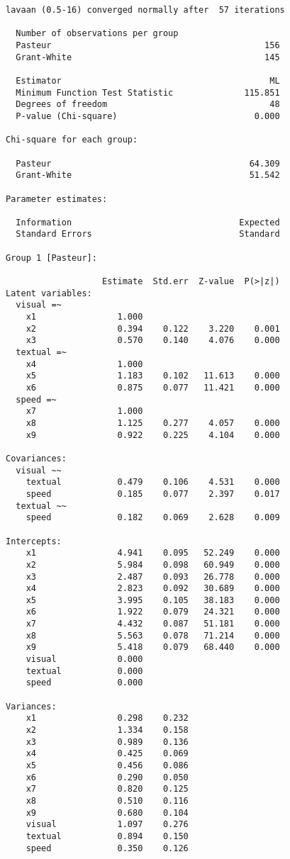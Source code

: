 \begin{verbatim}
lavaan (0.5-16) converged normally after  57 iterations

  Number of observations per group         
  Pasteur                                          156
  Grant-White                                      145

  Estimator                                         ML
  Minimum Function Test Statistic              115.851
  Degrees of freedom                                48
  P-value (Chi-square)                           0.000

Chi-square for each group:

  Pasteur                                       64.309
  Grant-White                                   51.542

Parameter estimates:

  Information                                 Expected
  Standard Errors                             Standard

Group 1 [Pasteur]:

                   Estimate  Std.err  Z-value  P(>|z|)
Latent variables:
  visual =~
    x1                1.000
    x2                0.394    0.122    3.220    0.001
    x3                0.570    0.140    4.076    0.000
  textual =~
    x4                1.000
    x5                1.183    0.102   11.613    0.000
    x6                0.875    0.077   11.421    0.000
  speed =~
    x7                1.000
    x8                1.125    0.277    4.057    0.000
    x9                0.922    0.225    4.104    0.000

Covariances:
  visual ~~
    textual           0.479    0.106    4.531    0.000
    speed             0.185    0.077    2.397    0.017
  textual ~~
    speed             0.182    0.069    2.628    0.009

Intercepts:
    x1                4.941    0.095   52.249    0.000
    x2                5.984    0.098   60.949    0.000
    x3                2.487    0.093   26.778    0.000
    x4                2.823    0.092   30.689    0.000
    x5                3.995    0.105   38.183    0.000
    x6                1.922    0.079   24.321    0.000
    x7                4.432    0.087   51.181    0.000
    x8                5.563    0.078   71.214    0.000
    x9                5.418    0.079   68.440    0.000
    visual            0.000
    textual           0.000
    speed             0.000

Variances:
    x1                0.298    0.232
    x2                1.334    0.158
    x3                0.989    0.136
    x4                0.425    0.069
    x5                0.456    0.086
    x6                0.290    0.050
    x7                0.820    0.125
    x8                0.510    0.116
    x9                0.680    0.104
    visual            1.097    0.276
    textual           0.894    0.150
    speed             0.350    0.126




\end{verbatim}
